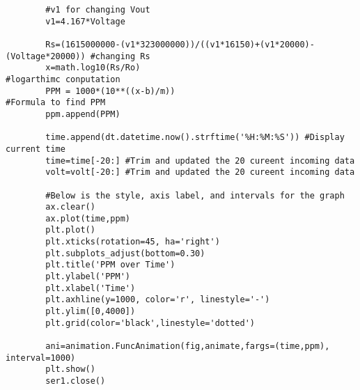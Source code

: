 \begin{lstlisting}
		#v1 for changing Vout		
		v1=4.167*Voltage		
				
		Rs=(1615000000-(v1*323000000))/((v1*16150)+(v1*20000)-(Voltage*20000)) #changing Rs		
		x=math.log10(Rs/Ro)                                                 #logarthimc conputation		
		PPM = 1000*(10**((x-b)/m))                                          #Formula to find PPM		
		ppm.append(PPM)
				
		time.append(dt.datetime.now().strftime('%H:%M:%S')) #Display current time 		
		time=time[-20:] #Trim and updated the 20 cureent incoming data 
		volt=volt[-20:] #Trim and updated the 20 cureent incoming data 
				
		#Below is the style, axis label, and intervals for the graph		
		ax.clear()		
		ax.plot(time,ppm)	
		plt.plot()		
		plt.xticks(rotation=45, ha='right')		
		plt.subplots_adjust(bottom=0.30)		
		plt.title('PPM over Time')		
		plt.ylabel('PPM')		
		plt.xlabel('Time')		
		plt.axhline(y=1000, color='r', linestyle='-')		
		plt.ylim([0,4000])
		plt.grid(color='black',linestyle='dotted')
				
		ani=animation.FuncAnimation(fig,animate,fargs=(time,ppm), interval=1000)		
		plt.show()		
		ser1.close()				
	\end{lstlisting}
